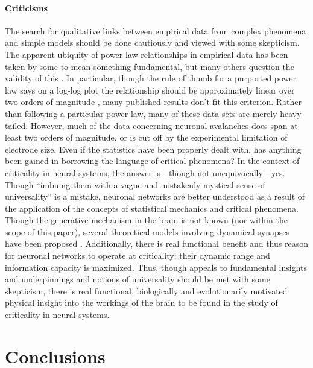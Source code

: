\documentclass[12pt]{article}
\begin{document}
\paragraph{Criticisms} The search for qualitative links between empirical data from complex phenomena and simple models should be done cautiously and viewed with some skepticism. The apparent ubiquity of power law relationships in empirical data has been taken by some \cite{Bak1987a} to mean something fundamental, but many others question the validity of this \cite{Stumpf2012a}. In particular, though the rule of thumb for a purported power law says on a log-log plot the relationship should be approximately linear over two orders of magnitude \cite{Sethna2011a}, many published results don't fit this criterion. Rather than following a particular power law, many of these data sets are merely heavy-tailed. However, much of the data concerning neuronal avalanches does span at least two orders of magnitude, or is cut off by the experimental limitation of electrode size. Even if the statistics have been properly dealt with, has anything been gained in borrowing the language of critical phenomena? In the context of criticality in neural systems, the answer is - though not unequivocally - yes. Though ``imbuing them with a vague and mistakenly mystical sense of universality'' \cite{Stumpf2012a} is a mistake, neuronal networks are better understood as a result of the application of the concepts of statistical mechanics and critical phenomena. Though the generative mechanism in the brain is not known (nor within the scope of this paper), several theoretical models involving dynamical synapses have been proposed \cite{Levina2007a, Levina2009a, Bornholdt2003a, Rybarsch2014a}. Additionally, there is real functional benefit and thus reason for neuronal networks to operate at criticality: their dynamic range and information capacity is maximized. Thus, though appeals to fundamental insights and underpinnings and notions of universality should be met with some skepticism, there is real functional, biologically and evolutionarily motivated physical insight into the workings of the brain to be found in the study of criticality in neural systems.

\section*{Conclusions}
\end{document}

